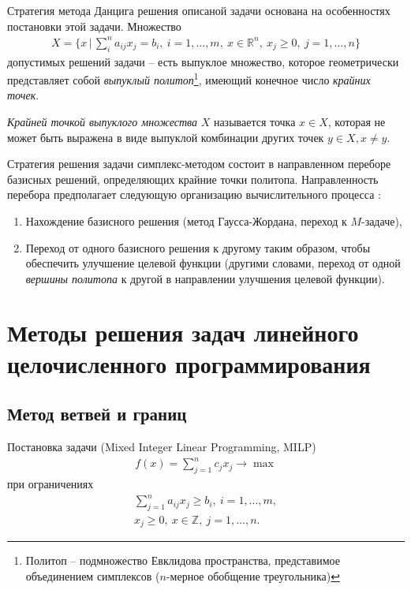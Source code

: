\documentclass[%
	11pt,
	a4paper,
	utf8,
		]{article}
\begin{document}
Стратегия метода Данцига решения описаной задачи основана на особенностях постановки этой задачи. Множество
\begin{align*}
	X = \{ x \, | \, \sum_{i}^{n} a_{ij} x_j = b_i, \ i = 1, \ldots, m, \ x \in \mathbb{R}^n, \ x_j \geqslant 0, \ j = 1, \ldots, n \}
\end{align*}
допустимых решений задачи -- есть выпуклое множество, которое геометрически представляет собой \emph{выпуклый политоп}\footnote{Политоп -- подмножество Евклидова пространства, представимое объединением симплексов ($ n $-мерное обобщение треугольника)}, имеющий конечное число \emph{крайних точек}.

\emph{Крайней точкой выпуклого множества} $ X $ называется точка $ x \in X $, которая не может быть выражена в виде выпуклой комбинации других точек $ y \in X, x \neq y $.

Стратегия решения задачи симплекс-методом состоит в направленном переборе базисных решений, определяющих крайние точки политопа. Направленность перебора предполагает следующую организацию вычислительного процесса \cite{panteleev}:
\begin{enumerate}
	\item Нахождение базисного решения (метод Гаусса-Жордана, переход к $ M $-задаче),
	
	\item Переход от одного базисного решения к другому таким образом, чтобы обеспечить улучшение целевой функции (другими словами, переход от одной \emph{вершины политопа} к другой в направлении улучшения целевой функции).
\end{enumerate}






\section{Методы решения задач линейного целочисленного программирования}

\subsection{Метод ветвей и границ}

Постановка задачи (Mixed Integer Linear Programming, MILP)
\begin{align*}
	f(x) = \sum_{j=1}^{n} c_j x_j \rightarrow \max
\end{align*}
при ограничениях
\begin{align*}
	\sum_{j=1}^{n} a_{ij} x_j \geqslant b_i, \ i = 1, \ldots, m,\\
	x_j \geqslant 0, \ x \in \mathbb{Z}, \ j = 1, \ldots, n.
\end{align*}
\end{document}
